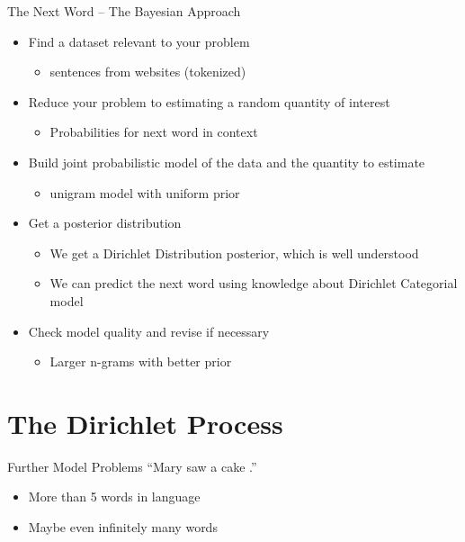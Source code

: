 \documentclass[11pt]{beamer}
\begin{document}
	\begin{frame}{The Next Word -- The Bayesian Approach}
		\centering
		\begin{itemize}
			\item Find a dataset relevant to your problem
			\begin{itemize}
				\item sentences from websites (tokenized) \checkmark
			\end{itemize}
			\item Reduce your problem to estimating a random quantity of interest
			\begin{itemize}
				\item Probabilities for next word in context \checkmark 
			\end{itemize}
			\item Build joint probabilistic model of the data and the quantity to estimate
			\begin{itemize}
				\item unigram model with uniform prior \checkmark
			\end{itemize}
			\item Get a posterior distribution
			\begin{itemize}
				\item We get a Dirichlet Distribution posterior, which is well understood \checkmark
				\item We can predict the next word using knowledge about Dirichlet Categorial model \checkmark
			\end{itemize}
			\item Check model quality and revise if necessary
			\begin{itemize}
				\item Larger n-grams with better prior \checkmark
			\end{itemize}
		\end{itemize}
	\end{frame}
	
	\section{The Dirichlet Process}
	
	\begin{frame}{Further Model Problems}
		``Mary saw a cake .''
		
		\vspace{10pt}
		\begin{itemize}
			\item More than 5 words in language
			\item Maybe even infinitely many words
		\end{itemize}
	\end{frame}
	
\end{document}
